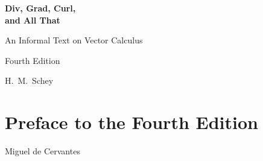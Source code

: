 \begin{titlepage}
\centering
\vspace*{3cm}
{\Huge\bfseries Div, Grad, Curl,\\[0.3em] and All That\par}
\vspace{1cm}
{\Large An Informal Text on Vector Calculus\par}
\vspace{2cm}
{\Large Fourth Edition\par}
\vspace{3cm}
{\large H.~M.~Schey\par}
\vfill
\end{titlepage}

\cleardoublepage

\chapter*{Preface to the Fourth Edition}
\begin{epigraphs}
%
{Miguel de Cervantes}
\end{epigraphs}


